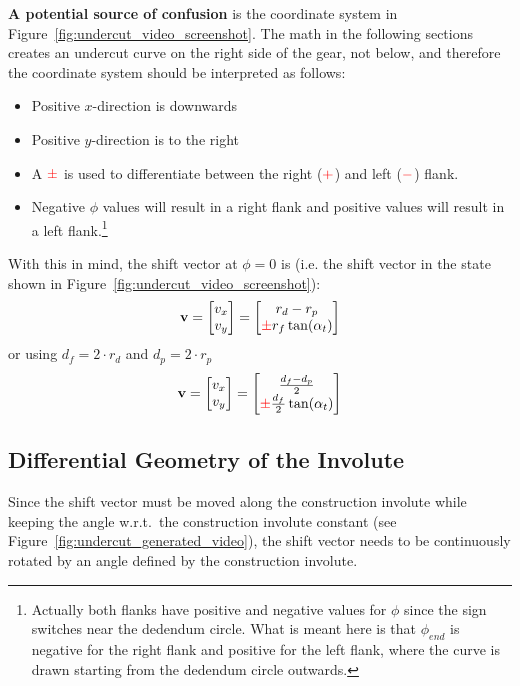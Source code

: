 \textbf{A potential source of confusion} is the coordinate system in Figure~\ref{fig:undercut_video_screenshot}. The math in the following sections creates an undercut curve on the right side of the gear, not below, and therefore the coordinate system should be interpreted as follows:
\begin{itemize}
    \item Positive $x$-direction is downwards
    \item Positive $y$-direction is to the right
    \item A $\textcolor{red}{\pm}$ is used to differentiate between the right ($\textcolor{red}{+}$) and left ($\textcolor{red}{-}$) flank.
    \item Negative $\phi$ values will result in a right flank and positive values will result in a left flank.\footnote{Actually both flanks have positive and negative values for $\phi$ since the sign switches near the dedendum circle. What is meant here is that $\phi_{end}$ is negative for the right flank and positive for the left flank, where the curve is drawn starting from the dedendum circle outwards.}
\end{itemize}

With this in mind, the shift vector at $\phi=0$ is (i.e. the shift vector in the state shown in Figure~\ref{fig:undercut_video_screenshot}):
\begin{equation}
    \vb v = \begin{bmatrix} v_x \\ v_y \end{bmatrix} = \begin{bmatrix} r_d - r_p \\ \textcolor{red}{\pm} r_f \tan(\alpha_t) \end{bmatrix}
\end{equation}
or using $d_f = 2\cdot r_d$ and $d_p = 2 \cdot r_p$
\begin{equation}
    \vb v = \begin{bmatrix} v_x \\ v_y \end{bmatrix} = \begin{bmatrix} \frac{d_f - d_p}{2} \\ \textcolor{red}{\pm} \frac{d_f}{2} \tan(\alpha_t) \end{bmatrix}
\end{equation}


\subsection{Differential Geometry of the Involute}
\label{subsec:diff_geom_invo}
Since the shift vector must be moved along the construction involute while keeping the angle w.r.t.\ the construction involute constant (see Figure~\ref{fig:undercut_generated_video}), the shift vector needs to be continuously rotated by an angle defined by the construction involute.

